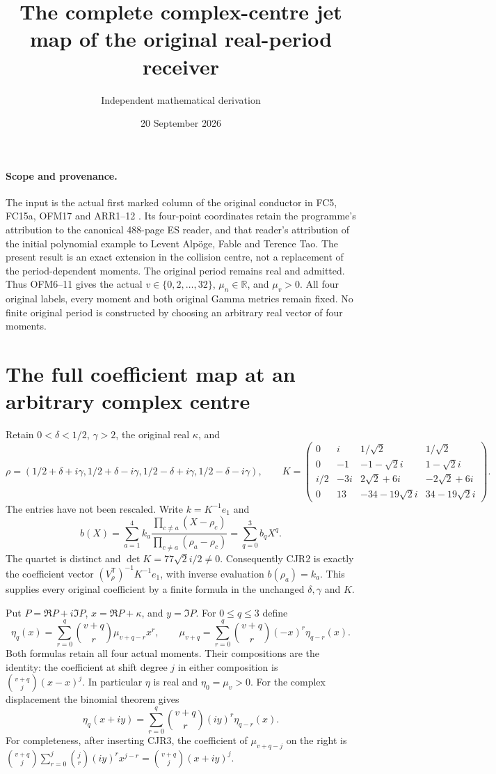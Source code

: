\documentclass[11pt]{article}
\title{The complete complex-centre jet map of the original real-period receiver}
\author{Independent mathematical derivation}
\date{20 September 2026}
\newcommand{\R}{\mathbb R}
\begin{document}
\maketitle

\paragraph{Scope and provenance.}
The input is the actual first marked column of the original conductor
in FC5, FC15a, OFM17 and ARR1--12 \cite{FC,ARR}. Its four-point
coordinates retain the programme's attribution to the canonical
488-page ES reader, and that reader's attribution of the initial
polynomial example to Levent Alp\"oge, Fable and Terence Tao.
The present result is an exact extension in the collision centre,
not a replacement of the period-dependent moments. The original
period remains real and admitted. Thus OFM6--11 gives the actual
$v\in\{0,2,\ldots,32\}$, $\mu_n\in\R$, and $\mu_v>0$.
All four original labels, every moment and both original Gamma
metrics remain fixed. No finite original period is constructed
by choosing an arbitrary real vector of four moments.

\section{The full coefficient map at an arbitrary complex centre}
Retain $0<\delta<1/2$, $\gamma>2$, the original real $\kappa$, and
\[
 \rho=(1/2+\delta+i\gamma,1/2+\delta-i\gamma,
       1/2-\delta+i\gamma,1/2-\delta-i\gamma),\qquad
 K=\begin{pmatrix}
 0&i&1/\sqrt2&1/\sqrt2\\
 0&-1&-1-\sqrt2i&1-\sqrt2i\\
 i/2&-3i&2\sqrt2+6i&-2\sqrt2+6i\\
 0&13&-34-19\sqrt2i&34-19\sqrt2i
 \end{pmatrix}.
 \tag{CJR1}
\]
The entries have not been rescaled. Write $k=K^{-1}e_1$ and
\[
 b(X)=\sum_{a=1}^4k_a
 \frac{\prod_{c\ne a}(X-\rho_c)}{\prod_{c\ne a}(\rho_a-\rho_c)}
 =\sum_{q=0}^3b_qX^q.
 \tag{CJR2}
\]
The quartet is distinct and $\det K=77\sqrt2i/2\ne0$.
Consequently CJR2 is exactly the coefficient vector
$(V_\rho^{\mathsf T})^{-1}K^{-1}e_1$, with inverse evaluation
$b(\rho_a)=k_a$. This supplies every original coefficient by a
finite formula in the unchanged $\delta,\gamma$ and $K$.

Put $P=\Re P+i\Im P$, $x=\Re P+\kappa$, and $y=\Im P$.
For $0\le q\le3$ define
\[
 \eta_q(x)=\sum_{r=0}^q\binom{v+q}{r}\mu_{v+q-r}x^r,
 \qquad
 \mu_{v+q}=\sum_{r=0}^q\binom{v+q}{r}(-x)^r\eta_{q-r}(x).
 \tag{CJR3}
\]
Both formulas retain all four actual moments. Their compositions
are the identity: the coefficient at shift degree $j$ in either
composition is $\binom{v+q}{j}(x-x)^j$. In particular $\eta$ is
real and $\eta_0=\mu_v>0$.
For the complex displacement the binomial theorem gives
\[
 \eta_q(x+iy)=\sum_{r=0}^q\binom{v+q}{r}(iy)^r\eta_{q-r}(x).
 \tag{CJR4}
\]
For completeness, after inserting CJR3, the coefficient of
$\mu_{v+q-j}$ on the right is
$\binom{v+q}{j}\sum_{r=0}^j\binom jr(iy)^rx^{j-r}
=\binom{v+q}{j}(x+iy)^j$.
\end{document}
